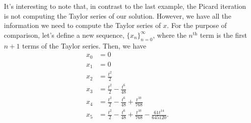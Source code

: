 \documentclass[10pt,a4paper]{article}
\theoremstyle{theorem}
\theoremstyle{definition}
\begin{document}
It's interesting to note that, in contrast to the last example,  the Picard iteration is not computing the Taylor series of our solution.  However, we have all the information we need to compute the Taylor series of $x$. For the purpose of comparison, let's define a new sequence, $\{x_n\}_{n = 0}^\infty$, where the $n^\text{th}$ term is the first $n + 1$ terms of the Taylor series. Then, we have
\begin{align*}
x_0 &= 0\\
x_1 &= 0\\
x_2 &= \frac{t^2}{2}\\
x_3 &= \frac{t^2}{2} - \frac{t^6}{48}\\
x_4 &= \frac{t^2}{2} - \frac{t^6}{48} + \frac{t^{10}}{768}\\
x_5 &= \frac{t^2}{2} - \frac{t^6}{48} + \frac{t^{10}}{768} - \frac{61 t^{14}}{645120}.
\end{align*}
\end{document}

